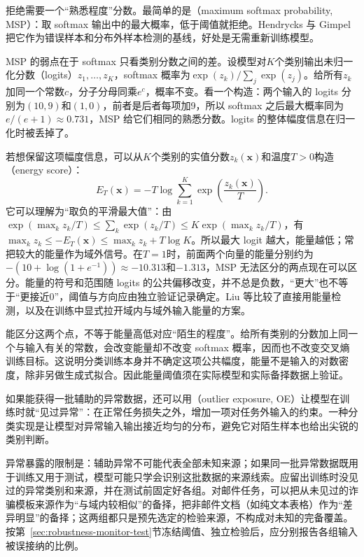 拒绝需要一个“熟悉程度”分数。最简单的是（maximum softmax probability, MSP）：取 softmax 输出中的最大概率，低于阈值就拒绝。Hendrycks 与 Gimpel 把它作为错误样本和分布外样本检测的基线，好处是无需重新训练模型。

MSP 的弱点在于 softmax 只看类别分数之间的差。设模型对$K$个类别输出未归一化分数（logits）$z_1,\ldots,z_K$，softmax 概率为$\exp(z_k)/\sum_j\exp(z_j)$。给所有$z_k$加同一个常数$c$，分子分母同乘$e^{c}$，概率不变。看一个构造：两个输入的 logits 分别为$(10,9)$和$(1,0)$，前者是后者每项加9，所以 softmax 之后最大概率同为$e/(e+1)\approx0.731$，MSP 给它们相同的熟悉分数。logits 的整体幅度信息在归一化时被丢掉了。

若想保留这项幅度信息，可以从$K$个类别的实值分数$z_k(\bm{x})$和温度$T>0$构造（energy score）：
\begin{equation}
 E_T(\bm{x})=-T\log\sum_{k=1}^{K}
       \exp\!\left(\frac{z_k(\bm{x})}{T}\right).
 \label{eq:robustness-energy}
\end{equation}
它可以理解为“取负的平滑最大值”：由$\exp(\max_kz_k/T)\leq\sum_k\exp(z_k/T)\leq K\exp(\max_kz_k/T)$，有$\max_kz_k\leq-E_T(\bm x)\leq\max_kz_k+T\log K$。所以最大 logit 越大，能量越低；常把较大的能量作为域外信号。在$T=1$时，前面两个向量的能量分别约为$-(10+\log(1+e^{-1}))\approx-10.313$和$-1.313$，MSP 无法区分的两点现在可以区分。能量的符号和范围随 logits 的公共偏移改变，并不总是负数，“更大”也不等于“更接近0”，阈值与方向应由独立验证记录确定。Liu 等比较了直接用能量检测，以及在训练中显式拉开域内与域外输入能量的方案。

能区分这两个点，不等于能量高低对应“陌生的程度”。给所有类别的分数加上同一个与输入有关的常数，会改变能量却不改变 softmax 概率，因而也不改变交叉熵训练目标。这说明分类训练本身并不确定这项公共幅度，能量不是输入的对数密度，除非另做生成式拟合。因此能量阈值须在实际模型和实际备择数据上验证。

如果能获得一批辅助的异常数据，还可以用（outlier exposure, OE）让模型在训练时就“见过异常”：在正常任务损失之外，增加一项对任务外输入的约束。一种分类实现是让模型对异常输入输出接近均匀的分布，避免它对陌生样本也给出尖锐的类别判断。

异常暴露的限制是：辅助异常不可能代表全部未知来源；如果同一批异常数据既用于训练又用于测试，模型可能只学会识别这批数据的来源线索。应留出训练时没见过的异常类别和来源，并在测试前固定好各组。对邮件任务，可以把从未见过的诈骗模板来源作为“与域内较相似”的备择，把非邮件文档（如纯文本表格）作为“差异明显”的备择；这两组都只是预先选定的检验来源，不构成对未知的完备覆盖。按第~\ref{sec:robustness-monitor-test}节冻结阈值、独立检验后，应分别报告各组输入被误接纳的比例。

